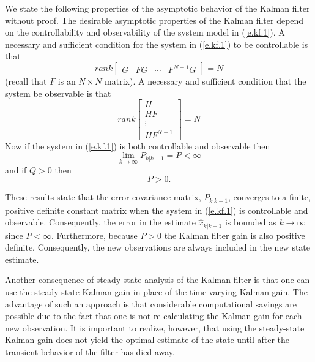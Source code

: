	We state the following properties of the
asymptotic behavior of the Kalman filter without
proof.  The desirable asymptotic properties of the Kalman
filter depend on the controllability and observability of
the system model in (\ref{e.kf.1}).  A necessary
and sufficient condition for the system in (\ref{e.kf.1}) to be
controllable is that
%
\begin{equation}
rank[\begin{array}{cccc}G&FG&\cdots&F^{N-1}G\end{array}]=N
\label{e.kf.31}
\end{equation}
%
(recall that $F$ is an $N\times N$ matrix).  A necessary and
sufficient condition that the system be observable is that
%
\begin{equation}
rank\left[\begin{array}{c}H\\HF\\\vdots\\HF^{N-1}\end{array}\right]=N
\label{e.kf.32}
\end{equation}
%
Now if the system in (\ref{e.kf.1}) is both controllable and observable
then
%
\begin{equation}
\lim_{k\rightarrow\infty}P_{k|k-1}=P<\infty
\label{e.kf.33}
\end{equation}
%
and if $Q>0$ then
%
\begin{equation}
P>0.
\label{e.kf.34}
\end{equation}
%

	These results state that the error covariance matrix,
$P_{k|k-1}$, converges to a finite, positive definite constant matrix
when the system in (\ref{e.kf.1}) is controllable and observable.
Consequently, the error in the estimate $\hat{x}_{k|k-1}$ is bounded
as $k\rightarrow\infty$ since $P<\infty$.  Furthermore, because $P>0$
the Kalman filter gain is also positive definite.  Consequently, the new
observations are always included in the new state estimate.

	Another consequence of steady-state analysis of the Kalman
filter is that one can use the steady-state Kalman gain in place of
the time varying Kalman gain.  The advantage of such an approach is
that considerable computational savings are possible due to the fact
that one is not re-calculating the Kalman gain for each new observation.
It is important to realize, however, that using the steady-state
Kalman gain does not yield the optimal estimate of the state until after
the transient behavior of the filter has died away.

